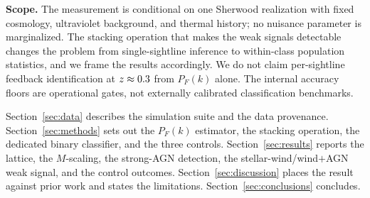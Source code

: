 \textbf{Scope.} The measurement is conditional on one Sherwood realization with
fixed cosmology, ultraviolet background, and thermal history; no nuisance
parameter is marginalized. The stacking operation that makes the weak signals
detectable changes the problem from single-sightline inference to within-class
population statistics, and we frame the results accordingly. We do not claim
per-sightline feedback identification at $z\approx0.3$ from $P_F(k)$ alone.
The internal accuracy floors are operational gates, not externally calibrated
classification benchmarks.

Section~\ref{sec:data} describes the simulation suite and the data provenance.
Section~\ref{sec:methods} sets out the $P_F(k)$ estimator, the stacking
operation, the dedicated binary classifier, and the three controls.
Section~\ref{sec:results} reports the lattice, the $M$-scaling, the strong-AGN
detection, the stellar-wind/wind${+}$AGN weak signal, and the control outcomes.
Section~\ref{sec:discussion} places the result against prior work and states the
limitations. Section~\ref{sec:conclusions} concludes.
